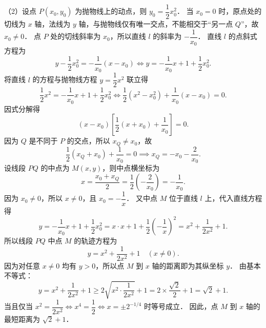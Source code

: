\begin{answer}
（2）设点 $P(x_0, y_0)$ 为抛物线上的动点，则 $y_0 = \dfrac{1}{2}x_0^2$．
当 $x_0 = 0$ 时，原点处的切线为 $x$ 轴，法线为 $y$ 轴，与抛物线仅有唯一交点，不能相交于“另一点 $Q$”，故 $x_0 \neq 0$．
点 $P$ 处的切线斜率为 $x_0$，所以直线 $l$ 的斜率为 $-\dfrac{1}{x_0}$．
直线 $l$ 的点斜式方程为
\nopagebreak[4]
\[
y - \frac{1}{2}x_0^2 = -\frac{1}{x_0}(x - x_0) \iff y = -\frac{1}{x_0}x + 1 + \frac{1}{2}x_0^2.
\]
将直线 $l$ 的方程与抛物线方程 $y = \dfrac{1}{2}x^2$ 联立得
\nopagebreak[4]
\[
\frac{1}{2}x^2 = -\frac{1}{x_0}x + 1 + \frac{1}{2}x_0^2 \iff \frac{1}{2}(x^2 - x_0^2) + \frac{1}{x_0}(x - x_0) = 0.
\]
因式分解得
\nopagebreak[4]
\[
(x - x_0)\left[\frac{1}{2}(x + x_0) + \frac{1}{x_0}\right] = 0.
\]
因为 $Q$ 是不同于 $P$ 的交点，所以 $x_Q \neq x_0$，故
\nopagebreak[4]
\[
\frac{1}{2}(x_Q + x_0) + \frac{1}{x_0} = 0 \implies x_Q = -x_0 - \frac{2}{x_0}.
\]
设线段 $PQ$ 的中点为 $M(x, y)$，则中点横坐标为
\nopagebreak[4]
\[
x = \frac{x_0 + x_Q}{2} = \frac{1}{2}\left(-\frac{2}{x_0}\right) = -\frac{1}{x_0}.
\]
因为 $x_0 \neq 0$，所以 $x \neq 0$，且 $x_0 = -\dfrac{1}{x}$．
又中点 $M$ 位于直线 $l$ 上，代入直线方程得
\nopagebreak[4]
\[
y = -\frac{1}{x_0}x + 1 + \frac{1}{2}x_0^2 = x \cdot x + 1 + \frac{1}{2}\left(-\frac{1}{x}\right)^2 = x^2 + \frac{1}{2x^2} + 1.
\]
所以线段 $PQ$ 中点 $M$ 的轨迹方程为
\nopagebreak[4]
\[
y = x^2 + \frac{1}{2x^2} + 1 \quad (x \neq 0).
\]
因为对任意 $x \neq 0$ 均有 $y > 0$，所以点 $M$ 到 $x$ 轴的距离即为其纵坐标 $y$．
由基本不等式：
\nopagebreak[4]
\[
y = x^2 + \frac{1}{2x^2} + 1 \geqslant 2\sqrt{x^2 \cdot \frac{1}{2x^2}} + 1 = 2 \times \frac{\sqrt{2}}{2} + 1 = \sqrt{2} + 1.
\]
当且仅当 $x^2 = \dfrac{1}{2x^2} \iff x^4 = \dfrac{1}{2} \iff x = \pm 2^{-1/4}$ 时等号成立．
因此，点 $M$ 到 $x$ 轴的最短距离为 $\sqrt{2} + 1$．
\nopagebreak[4]
\begin{center}\end{center}
\nopagebreak[4]

\end{answer}

